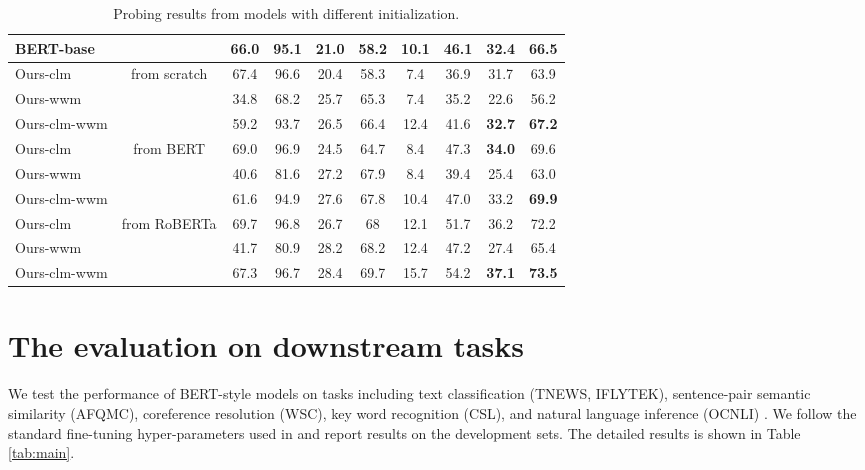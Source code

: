 \documentclass[11pt]{article}
\newcommand{\ourrobertafurther}{\textsl{RoBERTa-clm-wwm}\ }
\begin{document}
\begin{table*}[ht]
\begin{tabular}{l|c|cc|cc|cc|cc}
    \midrule
    BERT-base &       & 66.0    & 95.1  & 21.0    & 58.2  & 10.1  & 46.1  & 32.4  & 66.5 \\
    \midrule
    Ours-clm & \multirow{3}[2]{*}{from scratch} & 67.4  & 96.6  & 20.4  & 58.3  & 7.4   & 36.9  & 31.7  & 63.9 \\
    Ours-wwm &       & 34.8  & 68.2  & 25.7  & 65.3  & 7.4   & 35.2  & 22.6  & 56.2 \\
    Ours-clm-wwm &       & 59.2  & 93.7  & 26.5  & 66.4  & 12.4  & 41.6  & \textbf{32.7}  & \textbf{67.2} \\
    \midrule
    Ours-clm & \multirow{3}[1]{*}{from BERT} & 69.0    & 96.9  & 24.5  & 64.7  & 8.4   & 47.3  & \textbf{34.0}    & 69.6 \\
    Ours-wwm &       & 40.6  & 81.6  & 27.2  & 67.9  & 8.4   & 39.4  & 25.4  & 63.0 \\
    Ours-clm-wwm &       & 61.6  & 94.9  & 27.6  & 67.8  & 10.4  & 47.0    & 33.2  & \textbf{69.9} \\
    \midrule
    Ours-clm & \multirow{3}[1]{*}{from RoBERTa} & 69.7  & 96.8  & 26.7  & 68    & 12.1  & 51.7  & 36.2  & 72.2 \\
    Ours-wwm &       & 41.7  & 80.9  & 28.2  & 68.2  & 12.4  & 47.2  & 27.4  & 65.4 \\
    Ours-clm-wwm &       & 67.3  & 96.7  & 28.4  & 69.7  & 15.7  & 54.2  & \textbf{37.1}  & \textbf{73.5} \\
    \bottomrule
    \end{tabular}%
  \caption{Probing results from models with different initialization.}
  \label{tab:allmodels}%
\end{table*}%

\section{The evaluation on downstream tasks}\label{downstream}

We test the performance of BERT-style models on tasks including text classification (TNEWS, IFLYTEK), sentence-pair semantic similarity (AFQMC), coreference resolution (WSC), key word recognition (CSL), and natural language inference (OCNLI) \cite{xu-etal-2020-clue}.
We follow the standard fine-tuning hyper-parameters used in \citet{devlin2018bert,xu2020clue,lai2021lattice}
and report results on the development sets. 
The detailed results is shown in Table \ref{tab:main}.
\end{document}
